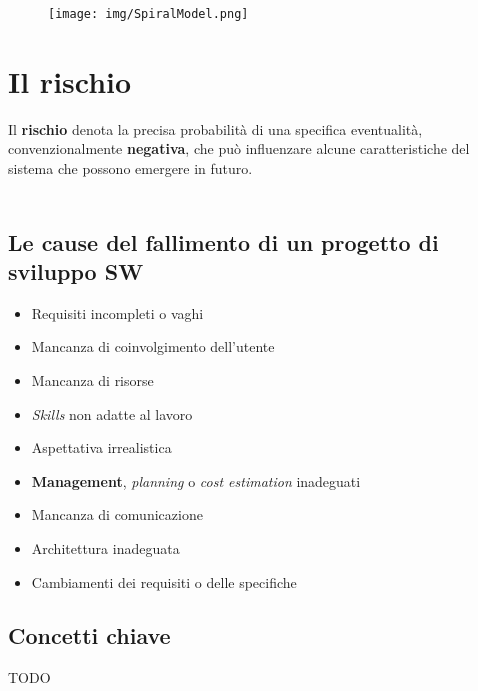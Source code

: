 \begin{figure}[H]
    \centering
    \texttt{[image: img/SpiralModel.png]}
\end{figure}

\section{Il rischio}
Il \textbf{rischio} denota la precisa probabilit\`a di una specifica
eventualit\`a, convenzionalmente \textbf{negativa}, che pu\`o
influenzare alcune caratteristiche del sistema che possono emergere
in futuro.\\~\\

\subsection{Le cause del fallimento di un progetto di sviluppo SW}
\begin{itemize}
    \item Requisiti incompleti o vaghi
    \item Mancanza di coinvolgimento dell'utente
    \item Mancanza di risorse
    \item \textit{Skills} non adatte al lavoro
    \item Aspettativa irrealistica
    \item \textbf{Management}, \textit{planning} o \textit{cost estimation}
            inadeguati
    \item Mancanza di comunicazione
    \item Architettura inadeguata
    \item Cambiamenti dei requisiti o delle specifiche
\end{itemize}

\subsection{Concetti chiave}

TODO


